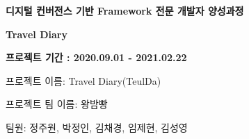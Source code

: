 
\begin{titlepage}
   \begin{flushleft}
      \vspace*{3.5cm}

      \centering 
      
      \textbf{\LARGE{디지털 컨버전스 기반 Framework 전문 개발자 양성과정}}

      \vspace{0.5cm}

      \textbf{{\fontsize{60}{48} \selectfont\color{myred}Travel Diary}}
          
      \vspace{1cm}


      \vfill

      \raggedleft\large
      \textbf{프로젝트 기간 : 2020.09.01 - 2021.02.22}

      프로젝트 이름: Travel Diary(TeulDa)

      프로젝트 팀 이름: 왕밤빵

      팀원: 정주원, 박정인, 김채경, 임제현, 김성영
      \normalsize

   \end{flushleft}
\end{titlepage}

\begingroup
  \pagestyle{empty}
  \null
  \newpage
  \null
  \newpage
  \null
  \newpage
\endgroup